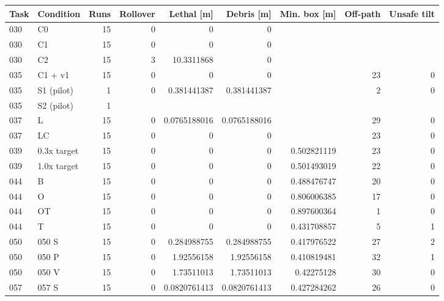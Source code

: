 \begin{tabular}{llrrrrrrr}
\hline
Task & Condition & Runs & Rollover & Lethal [m] & Debris [m] & Min. box [m] & Off-path & Unsafe tilt \\
\hline
030 & C0 & 15 & 0 & 0 & 0 & \textemdash{} & \textemdash{} & \textemdash{} \\
030 & C1 & 15 & 0 & 0 & 0 & \textemdash{} & \textemdash{} & \textemdash{} \\
030 & C2 & 15 & 3 & 10.3311868 & 0 & \textemdash{} & \textemdash{} & \textemdash{} \\
035 & C1 + v1 & 15 & 0 & 0 & 0 & \textemdash{} & 23 & 0 \\
035 & S1 (pilot) & 1 & 0 & 0.381441387 & 0.381441387 & \textemdash{} & 2 & 0 \\
035 & S2 (pilot) & 1 & \textemdash{} & \textemdash{} & \textemdash{} & \textemdash{} & \textemdash{} & \textemdash{} \\
037 & L & 15 & 0 & 0.0765188016 & 0.0765188016 & \textemdash{} & 29 & 0 \\
037 & LC & 15 & 0 & 0 & 0 & \textemdash{} & 23 & 0 \\
039 & 0.3x target & 15 & 0 & 0 & 0 & 0.502821119 & 23 & 0 \\
039 & 1.0x target & 15 & 0 & 0 & 0 & 0.501493019 & 22 & 0 \\
044 & B & 15 & 0 & 0 & 0 & 0.488476747 & 20 & 0 \\
044 & O & 15 & 0 & 0 & 0 & 0.806006385 & 17 & 0 \\
044 & OT & 15 & 0 & 0 & 0 & 0.897600364 & 1 & 0 \\
044 & T & 15 & 0 & 0 & 0 & 0.431708857 & 5 & 1 \\
050 & 050 S & 15 & 0 & 0.284988755 & 0.284988755 & 0.417976522 & 27 & 2 \\
050 & 050 P & 15 & 0 & 1.92556158 & 1.92556158 & 0.410819481 & 32 & 1 \\
050 & 050 V & 15 & 0 & 1.73511013 & 1.73511013 & 0.42275128 & 30 & 0 \\
057 & 057 S & 15 & 0 & 0.0820761413 & 0.0820761413 & 0.427284262 & 26 & 0 \\

\end{tabular}
